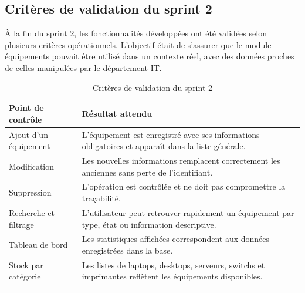 \subsection{Critères de validation du sprint 2}

À la fin du sprint 2, les fonctionnalités développées ont été validées selon plusieurs critères opérationnels. L'objectif était de s'assurer que le module équipements pouvait être utilisé dans un contexte réel, avec des données proches de celles manipulées par le département IT.

\begin{longtable}{|m{5cm}|m{8cm}|}
\hline
\textbf{Point de contrôle} & \textbf{Résultat attendu} \\
\hline
\endhead
\endfoot
\endlastfoot
\hline
Ajout d'un équipement & L'équipement est enregistré avec ses informations obligatoires et apparaît dans la liste générale. \\
\hline
Modification & Les nouvelles informations remplacent correctement les anciennes sans perte de l'identifiant. \\
\hline
Suppression & L'opération est contrôlée et ne doit pas compromettre la traçabilité. \\
\hline
Recherche et filtrage & L'utilisateur peut retrouver rapidement un équipement par type, état ou information descriptive. \\
\hline
Tableau de bord & Les statistiques affichées correspondent aux données enregistrées dans la base. \\
\hline
Stock par catégorie & Les listes de laptops, desktops, serveurs, switchs et imprimantes reflètent les équipements disponibles. \\
\hline
\captionsetup{justification=centering,margin=1cm}
\caption{Critères de validation du sprint 2}
\end{longtable}
    
